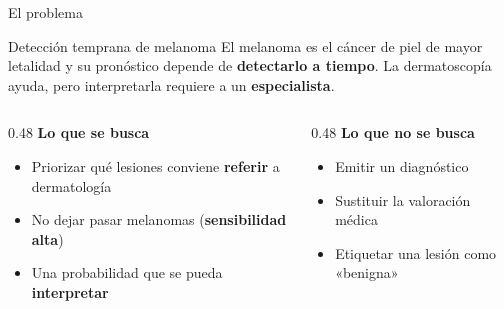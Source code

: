 \documentclass[aspectratio=169,10pt]{beamer}
\begin{document}
\begin{frame}{El problema}
  \begin{block}{Detección temprana de melanoma}
    El melanoma es el cáncer de piel de mayor letalidad y su pronóstico depende de \textbf{detectarlo a tiempo}. La dermatoscopía ayuda, pero interpretarla requiere a un \textbf{especialista}.
  \end{block}
  \vspace{0.5em}
  \begin{columns}[T]
    \begin{column}{0.48\textwidth}
      \textbf{Lo que se busca}
      \begin{itemize}
        \item Priorizar qué lesiones conviene \textbf{referir} a dermatología
        \item No dejar pasar melanomas (\textbf{sensibilidad alta})
        \item Una probabilidad que se pueda \textbf{interpretar}
      \end{itemize}
    \end{column}
    \begin{column}{0.48\textwidth}
      \textbf{Lo que no se busca}
      \begin{itemize}
        \item Emitir un diagnóstico
        \item Sustituir la valoración médica
        \item Etiquetar una lesión como «benigna»
      \end{itemize}
    \end{column}
  \end{columns}
\end{frame}
\end{document}
